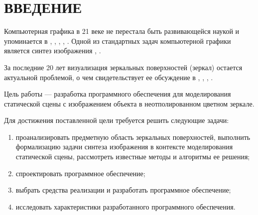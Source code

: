 \chapter*{ВВЕДЕНИЕ}

Компьютерная графика в 21 веке не перестала быть развивающейся наукой и упоминается в \cite{залогова2005компьютерная}, \cite{порев2002компьютерная}, \cite{тозик2013инженерная}, \cite{митин2016компьютерная}, \cite{турлюн2014компьютерная}. 
Одной из стандартных задач компьютерной графики является синтез изображения \cite{порев2002компьютерная}, \cite{куров}.

За последние 20 лет визуализация зеркальных поверхностей (зеркал) остается актуальной проблемой, о чем свидетельствует ее обсуждение в \cite{lensch2005realistic}, \cite{reshetouski2013mirrors}, \cite{miguel2014real}, \cite{hiranyachattada2021demonstration}.

Цель работы --- разработка программного обеспечения для моделирования статической сцены с изображением объекта в неотполированном цветном зеркале.

Для достижения поставленной цели требуется решить следующие задачи:

\begin{enumerate}
	\item проанализировать предметную область зеркальных поверхностей, выполнить формализацию задачи синтеза изображения в контексте моделирования статической сцены, рассмотреть известные методы и алгоритмы ее решения;
	\item спроектировать программное обеспечение;
	\item выбрать средства реализации и разработать программное обеспечение;
	\item исследовать характеристики разработанного программного обеспечения.
\end{enumerate}

%
%
\iffalse

\fi